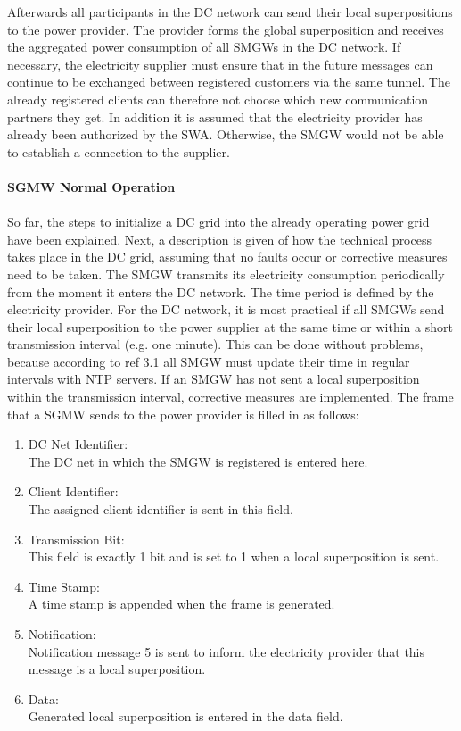 Afterwards all participants in the DC network can send their local superpositions to the power provider. The provider forms the global superposition and receives the aggregated power consumption of all SMGWs in the DC network. If necessary, the electricity supplier must ensure that in the future messages can continue to be exchanged between registered customers via the same tunnel. The already registered clients can therefore not choose which new communication partners they get. In addition it is assumed that the electricity provider has already been authorized by the SWA. Otherwise, the SMGW would not be able to establish a connection to the supplier.\\
\\
\textbf{SGMW Normal Operation}
\\
\\
So far, the steps to initialize a DC grid into the already operating power grid have been explained. Next, a description is given of how the technical process takes place in the DC grid, assuming that no faults occur or corrective measures need to be taken. The SMGW transmits its electricity consumption periodically from the moment it enters the DC network. The time period is defined by the electricity provider. For the DC network, it is most practical if all SMGWs send their local superposition to the power supplier at the same time or within a short transmission interval (e.g. one minute). This can be done without problems, because according to ref 3.1 all SMGW must update their time in regular intervals with NTP servers. If an SMGW has not sent a local superposition within the transmission interval, corrective measures are implemented. The frame that a SGMW sends to the power provider is filled in as follows:
\begin{enumerate}
\item DC Net Identifier:\\
The DC net in which the SMGW is registered is entered here.
\item Client Identifier:\\ 
The assigned client identifier is sent in this field.
\item Transmission Bit:\\
This field is exactly 1 bit and is set to 1 when a local superposition is sent.
\item Time Stamp:\\
A time stamp is appended when the frame is generated.
\item Notification:\\
Notification message 5 is sent to inform the electricity provider that this message is a local superposition.
\item Data:\\
Generated local superposition is entered in the data field.
\end{enumerate}
